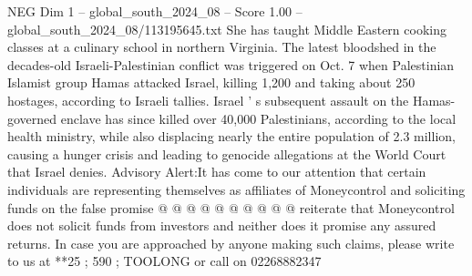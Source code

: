\begin{textsample}{NEG Dim 1 – global\_south\_2024\_08 – Score 1.00 – global\_south\_2024\_08/113195645.txt}
She has taught Middle Eastern cooking classes at a culinary school in northern Virginia.
The latest bloodshed in the decades-old Israeli-Palestinian conflict was triggered on Oct. 7 when Palestinian Islamist group Hamas attacked Israel, killing 1,200 and taking about 250 hostages, according to Israeli tallies.
Israel ' s subsequent assault on the Hamas-governed enclave has since killed over 40,000 Palestinians, according to the local health ministry, while also displacing nearly the entire population of 2.3 million, causing a hunger crisis and leading to genocide allegations at the World Court that Israel denies.
Advisory Alert:It has come to our attention that certain individuals are representing themselves as affiliates of Moneycontrol and soliciting funds on the false promise @ @ @ @ @ @ @ @ @ @ reiterate that Moneycontrol does not solicit funds from investors and neither does it promise any assured returns.
In case you are approached by anyone making such claims, please write to us at **25 ; 590 ; TOOLONG or call on 02268882347

\end{textsample}
